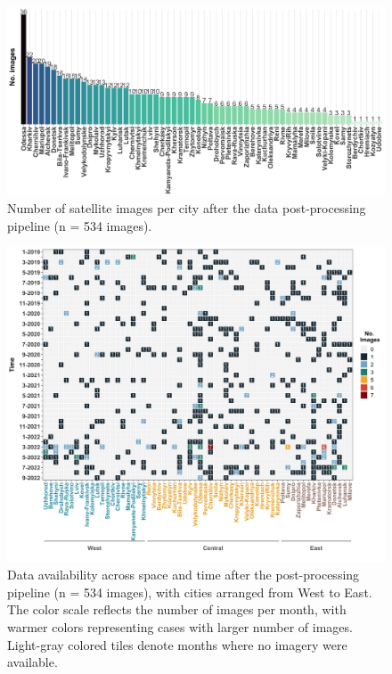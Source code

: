 \documentclass[sn-basic]{sn-jnl}%
\begin{document}
{\begin{appendices}
\begin{figure}[htbp]
\begin{center}
\includegraphics[width=\textwidth]{Figures/No_images_per_city.jpg}
\end{center}
\caption{Number of satellite images per city after the data post-processing pipeline (n =  534 images).}
\label{figSM_Nimages}
\end{figure}


\begin{figure}[htbp]
\begin{center}
\includegraphics[scale = 0.10]{Figures/No_images_per_time.jpg}
\end{center}
\caption{Data availability across space and time after the post-processing pipeline (n =  534 images), with cities arranged from West to East. The color scale reflects the number of images per month, with warmer colors representing cases with larger number of images. Light-gray colored tiles denote months where no imagery were available.}
\label{figSM_DatAvail}
\end{figure}



\end{appendices}}
\end{document}
